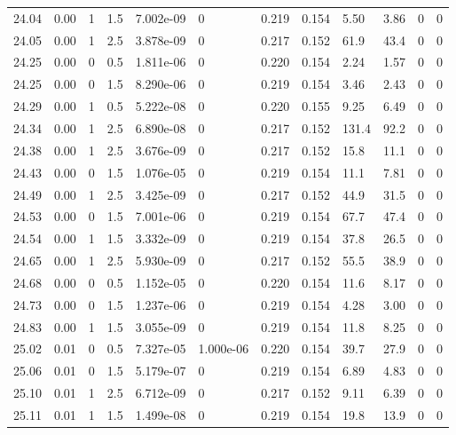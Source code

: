\documentclass[preview]{standalone}
\begin{document}
{{{{{{{{{{{\begin{tabular}{L{1.2cm}C{1.2cm} C{0.3cm}C{0.5cm} C{1.4cm}C{1.4cm} C{1.4cm}C{1.4cm} C{1.6cm}C{1.6cm} C{1.6cm}C{1.6cm}}
  24.04  &  0.00  & 1     & 1.5 &  7.002e-09  & 0  &  0.219&   0.154& 5.50 & 3.86   &  0 & 0  \\ 
  24.05  &  0.00  & 1     & 2.5 &  3.878e-09  & 0  &  0.217&   0.152& 61.9 & 43.4   &  0 & 0  \\ 
  24.25  &  0.00  & 0     & 0.5 &  1.811e-06  & 0  &  0.220&   0.154& 2.24 & 1.57   &  0 & 0  \\ 
  24.25  &  0.00  & 0     & 1.5 &  8.290e-06  & 0  &  0.219&   0.154& 3.46 & 2.43   &  0 & 0  \\ 
  24.29  &  0.00  & 1     & 0.5 &  5.222e-08  & 0  &  0.220&   0.155& 9.25 & 6.49   &  0 & 0  \\ 
  24.34  &  0.00  & 1     & 2.5 &  6.890e-08  & 0  &  0.217&   0.152& 131.4 & 92.2   &  0 & 0  \\ 
  24.38  &  0.00  & 1     & 2.5 &  3.676e-09  & 0  &  0.217&   0.152& 15.8 & 11.1   &  0 & 0  \\ 
  24.43  &  0.00  & 0     & 1.5 &  1.076e-05  & 0  &  0.219&   0.154& 11.1 & 7.81   &  0 & 0  \\ 
  24.49  &  0.00  & 1     & 2.5 &  3.425e-09  & 0  &  0.217&   0.152& 44.9 & 31.5   &  0 & 0  \\ 
  24.53  &  0.00  & 0     & 1.5 &  7.001e-06  & 0  &  0.219&   0.154& 67.7 & 47.4   &  0 & 0  \\ 
  24.54  &  0.00  & 1     & 1.5 &  3.332e-09  & 0  &  0.219&   0.154& 37.8 & 26.5   &  0 & 0  \\ 
  24.65  &  0.00  & 1     & 2.5 &  5.930e-09  & 0  &  0.217&   0.152& 55.5 & 38.9   &  0 & 0  \\ 
  24.68  &  0.00  & 0     & 0.5 &  1.152e-05  & 0  &  0.220&   0.154& 11.6 & 8.17   &  0 & 0  \\ 
  24.73  &  0.00  & 0     & 1.5 &  1.237e-06  & 0  &  0.219&   0.154& 4.28 & 3.00   &  0 & 0  \\ 
  24.83  &  0.00  & 1     & 1.5 &  3.055e-09  & 0  &  0.219&   0.154& 11.8 & 8.25   &  0 & 0  \\ 
  25.02  &  0.01  & 0     & 0.5 &  7.327e-05  & 1.000e-06  &  0.220&   0.154& 39.7 & 27.9   &  0 & 0  \\ 
  25.06  &  0.01  & 0     & 1.5 &  5.179e-07  & 0  &  0.219&   0.154& 6.89 & 4.83   &  0 & 0  \\ 
  25.10  &  0.01  & 1     & 2.5 &  6.712e-09  & 0  &  0.217&   0.152& 9.11 & 6.39   &  0 & 0  \\ 
  25.11  &  0.01  & 1     & 1.5 &  1.499e-08  & 0  &  0.219&   0.154& 19.8 & 13.9   &  0 & 0  \\ 

\end{tabular}}}}}}}}}}}}
\end{document}
